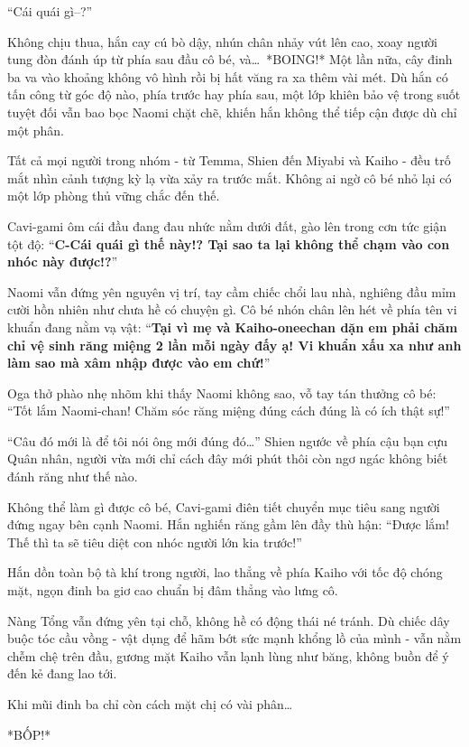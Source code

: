\documentclass[../main.tex]{subfiles}
\begin{document}
``Cái quái gì--?''

Không chịu thua, hắn cay cú bò dậy, nhún chân nhảy vút lên cao, xoay người tung đòn đánh úp từ phía sau đầu cô bé, và\dots\ *BOING!* Một lần nữa, cây đinh ba va vào khoảng không vô hình rồi bị hất văng ra xa thêm vài mét. Dù hắn có tấn công từ góc độ nào, phía trước hay phía sau, một lớp khiên bảo vệ trong suốt tuyệt đối vẫn bao bọc Naomi chặt chẽ, khiến hắn không thể tiếp cận được dù chỉ một phân.

Tất cả mọi người trong nhóm - từ Temma, Shien đến Miyabi và Kaiho - đều trố mắt nhìn cảnh tượng kỳ lạ vừa xảy ra trước mắt. Không ai ngờ cô bé nhỏ lại có một lớp phòng thủ vững chắc đến thế.

Cavi-gami ôm cái đầu đang đau nhức nằm dưới đất, gào lên trong cơn tức giận tột độ: ``\textbf{C-Cái quái gì thế này!? Tại sao ta lại không thể chạm vào con nhóc này được!?}''

Naomi vẫn đứng yên nguyên vị trí, tay cầm chiếc chổi lau nhà, nghiêng đầu mỉm cười hồn nhiên như chưa hề có chuyện gì. Cô bé nhón chân lên hét về phía tên vi khuẩn đang nằm vạ vật: ``\textbf{Tại vì mẹ và Kaiho-oneechan dặn em phải chăm chỉ vệ sinh răng miệng 2 lần mỗi ngày đấy ạ! Vi khuẩn xấu xa như anh làm sao mà xâm nhập được vào em chứ!}''

Oga thở phào nhẹ nhõm khi thấy Naomi không sao, vỗ tay tán thưởng cô bé: ``Tốt lắm Naomi-chan! Chăm sóc răng miệng đúng cách đúng là có ích thật sự!''

``Câu đó mới là để tôi nói ông mới đúng đó\dots'' Shien ngước về phía cậu bạn cựu Quân nhân, người vừa mới chỉ cách đây mới phút thôi còn ngơ ngác không biết đánh răng như thế nào.

Không thể làm gì được cô bé, Cavi-gami điên tiết chuyển mục tiêu sang người đứng ngay bên cạnh Naomi. Hắn nghiến răng gầm lên đầy thù hận: ``Được lắm! Thế thì ta sẽ tiêu diệt con nhóc người lớn kia trước!''

Hắn dồn toàn bộ tà khí trong người, lao thẳng về phía Kaiho với tốc độ chóng mặt, ngọn đinh ba giơ cao chuẩn bị đâm thẳng vào lưng cô.

Nàng Tổng vẫn đứng yên tại chỗ, không hề có động thái né tránh. Dù chiếc dây buộc tóc cầu vồng - vật dụng để hãm bớt sức mạnh khổng lồ của mình - vẫn nằm chễm chệ trên đầu, gương mặt Kaiho vẫn lạnh lùng như băng, không buồn để ý đến kẻ đang lao tới.

Khi mũi đinh ba chỉ còn cách mặt chị có vài phân\dots

*BỐP!*
\end{document}
